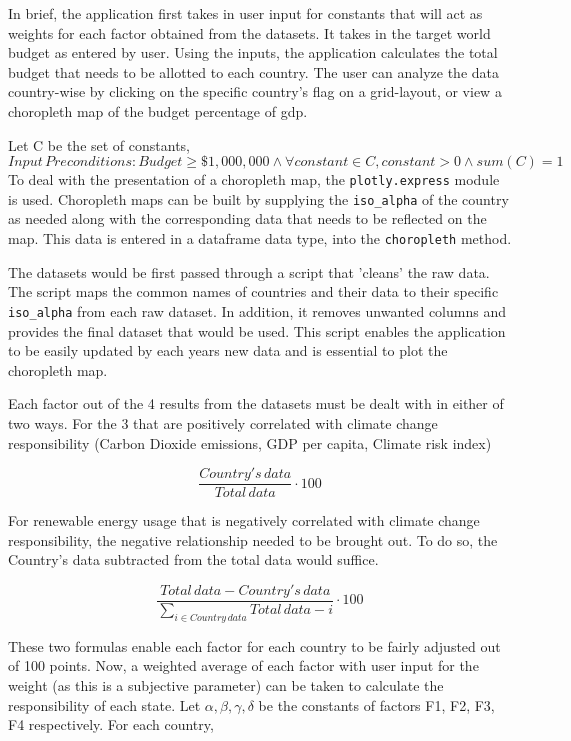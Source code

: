 \documentclass[fontsize=11pt]{article}
\begin{document}
In brief, the application first takes in user input for constants that will act as weights for each factor obtained
from the datasets.
It takes in the target world budget as entered by user.
Using the inputs, the application calculates the total budget that needs to be allotted to each country.
The user can analyze the data country-wise by clicking on the specific country's flag on a grid-layout, or view a
choropleth map of the budget percentage of gdp. \newline

Let C be the set of constants,
\[
Input \, Preconditions: Budget \geq \$1,000,000 \wedge \forall constant \in C , constant > 0 \wedge sum(C) = 1
\]
To deal with the presentation of a choropleth map, the \texttt{plotly.express}
module is used.
Choropleth maps can be built by supplying the \texttt{iso\_alpha} of the country as needed along with the corresponding
data that needs to be reflected on the map.
This data is entered in a dataframe data type, into the \texttt{choropleth} method.  \newline

The datasets would be first passed through a script that 'cleans' the raw data.
The script maps the common names of countries and their data to their specific
\texttt{iso\_alpha} from each raw dataset.
In addition, it removes unwanted columns and provides the final dataset that would be used.
This script enables the application to be easily updated by each years new data and is essential to plot the choropleth map.
\newline

Each factor out of the 4 results from the datasets must be
dealt with in either of two ways.
For the 3 that are positively correlated with climate change responsibility (Carbon Dioxide emissions,
GDP per capita, Climate risk index)

\[
\frac{Country's \, data}{Total \, data} \cdot 100
\]

For renewable energy usage that is negatively correlated with climate change responsibility, the
negative relationship needed to be brought out.
To do so, the Country's data subtracted from the total data would suffice.

\[
\frac{Total \, data - Country's \, data}{\displaystyle\sum_{i \in Country \, data} Total \, data -  i } \cdot 100
\]

These two formulas enable each factor for each country to be fairly adjusted out of 100 points.
Now, a weighted average of each factor with user input for the weight (as this is a subjective parameter) can be taken
to calculate the responsibility of each state.
Let $\alpha, \beta, \gamma, \delta$ be the constants of factors F1, F2, F3, F4 respectively.
For each country,
\end{document}
